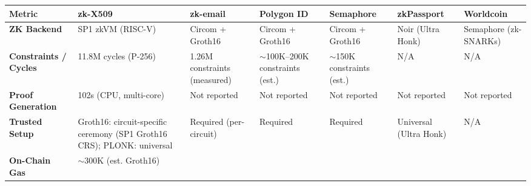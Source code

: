 \documentclass[11pt, a4paper]{article}
\begin{document}
\begin{longtable}[]{@{}
  >{\raggedright\arraybackslash}p{}
  >{\raggedright\arraybackslash}p{}
  >{\raggedright\arraybackslash}p{}
  >{\raggedright\arraybackslash}p{}
  >{\raggedright\arraybackslash}p{}
  >{\raggedright\arraybackslash}p{}
  >{\raggedright\arraybackslash}p{}@{}}
\toprule\noalign{}
\begin{minipage}[b]{\linewidth}\raggedright
Metric
\end{minipage} & \begin{minipage}[b]{\linewidth}\raggedright
zk-X509
\end{minipage} & \begin{minipage}[b]{\linewidth}\raggedright
zk-email
\end{minipage} & \begin{minipage}[b]{\linewidth}\raggedright
Polygon ID
\end{minipage} & \begin{minipage}[b]{\linewidth}\raggedright
Semaphore
\end{minipage} & \begin{minipage}[b]{\linewidth}\raggedright
zkPassport
\end{minipage} & \begin{minipage}[b]{\linewidth}\raggedright
Worldcoin
\end{minipage} \\
\midrule\noalign{}
\endhead
\bottomrule\noalign{}
\endlastfoot
\textbf{ZK Backend} & SP1 zkVM (RISC-V) & Circom + Groth16 & Circom +
Groth16 & Circom + Groth16 & Noir (Ultra Honk) & Semaphore (zk-SNARKs) \\
\textbf{Constraints / Cycles} & 11.8M cycles (P-256) & 1.26M constraints
(measured) & $\sim$100K--200K constraints (est.) & $\sim$150K
constraints (est.) & N/A & N/A \\
\textbf{Proof Generation} & 102s (CPU, multi-core) & Not reported & Not reported & Not reported &
Not reported & Not reported \\
\textbf{Trusted Setup} & Groth16: circuit-specific ceremony (SP1 Groth16 CRS); PLONK: universal & Required (per-circuit) &
Required & Required & Universal (Ultra Honk) & N/A \\
\textbf{On-Chain Gas} & $\sim$300K (est. Groth16) &

\end{longtable}
\end{document}
